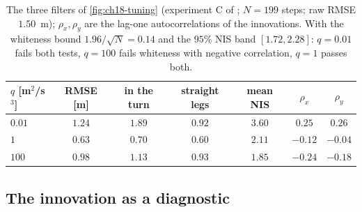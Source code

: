 \begin{table}[tb]
  \centering\small
  \caption{The three filters of \cref{fig:ch18-tuning} (experiment C of
  ; $N=199$ steps; raw RMSE $1.50$~m);
  $\rho_x,\rho_y$ are the lag-one autocorrelations of the innovations. With
  the whiteness bound $1.96/\sqrt N=0.14$ and the $95\%$ NIS band
  $[1.72,2.28]$: $q=0.01$ fails both tests, $q=100$ fails whiteness with
  negative correlation, $q=1$ passes both.}
  \label{tab:ch18-tuning}
  \begin{tabular}{@{}lcccccc@{}}
  \toprule
  $q$ [m$^2$/s$^3$] & RMSE [m] & in the turn & straight legs & mean NIS & $\rho_x$ & $\rho_y$\\
  \midrule
  $0.01$ & $1.24$ & $1.89$ & $0.92$ & $3.60$ & $0.25$ & $0.26$\\
  $1$    & $0.63$ & $0.70$ & $0.60$ & $2.11$ & $-0.12$ & $-0.04$\\
  $100$  & $0.98$ & $1.13$ & $0.93$ & $1.85$ & $-0.24$ & $-0.18$\\
  \bottomrule
  \end{tabular}
\end{table}

\subsection{The innovation as a diagnostic}
\label{sec:ch18-diagnostics}

